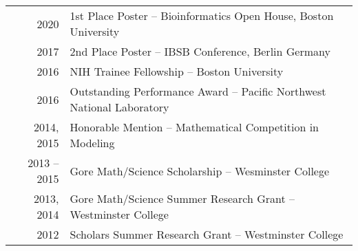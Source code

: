\documentclass[a4paper,10pt]{article}
\begin{document}
\section{\color{linkcolour}{Awards and Accolades}}
\begin{tabular}{rl}
2020 & 1st Place Poster -- Bioinformatics Open House, Boston University \\ 
2017 & 2nd Place Poster -- IBSB Conference, Berlin Germany \\
2016 & NIH Trainee Fellowship -- Boston University \\
2016 & Outstanding Performance Award -- Pacific Northwest National Laboratory \\
2014, 2015 & Honorable Mention -- Mathematical Competition in Modeling \\
2013 -- 2015 &  Gore Math/Science Scholarship -- Wesminster College \\
2013, 2014 & Gore Math/Science Summer Research Grant -- Westminster College \\
2012 & Scholars Summer Research Grant -- Westminster College
\end{tabular}
\end{document}
